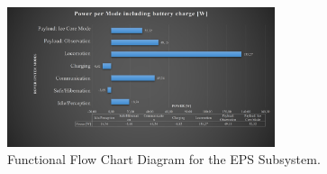 \begin{figure}[htb]
{\centering
\includegraphics[width=0.7\textwidth]{Media/epspowersummary}
\caption{Functional Flow Chart Diagram for the EPS Subsystem.}
\label{fig:epspowersummary}
}
\end{figure}




